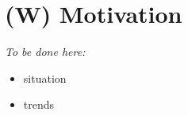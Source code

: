 \section{(W) Motivation}\label{s:motivation}
    \emph{To be done here:}
    \begin{itemize}
        \item situation
        \item trends
    \end{itemize}